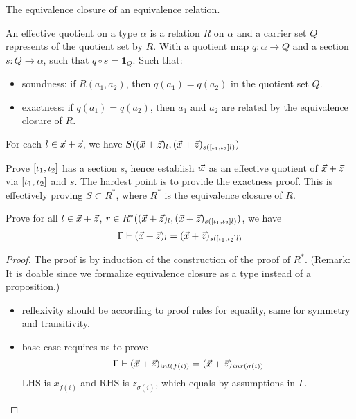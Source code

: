\begin{definition}
  The equivalence closure of an equivalence relation.
  \leanok
\end{definition}

\begin{definition}
  \leanok
  An effective quotient on a type $\alpha$ is a relation $R$ on $\alpha$ and a carrier set $Q$ represents of the quotient
  set by $R$. With a quotient map $q:\alpha\to Q$ and a section $s:Q\to \alpha$, such that $q\circ s = \mathbf{1}_Q$. Such that:
  \begin{itemize}
    \item soundness: if $R(a_1,a_2)$, then $q(a_1) = q(a_2)$ in the quotient set $Q$.
    \item exactness: if $q(a_1) = q(a_2)$, then $a_1$ and $a_2$ are related by the equivalence closure of $R$.
  \end{itemize}

\end{definition}

\begin{lemma}\label{Lem:CovWit1}
  For each $l\in \vec{x}+\vec{z}$, we have $S((\vec{x}+\vec{z})_l, (\vec{x}+\vec{z})_{s([\iota_1,\iota_2] l)})$
\end{lemma}

\begin{lemma}\label{Lem:CovWit2}
  Prove $[\iota_1,\iota_2]$ has a section $s$, hence establish $\vec{w}$ as an effective quotient of $\vec{x} +\vec{z}$ via $[\iota_1,\iota_2]$ and $s$.
  The hardest point is to provide the exactness proof.
  This is effectively proving $S\subset R^*$, where $R^*$ is the equivalence closure of $R$.
\end{lemma}


\begin{lemma}\label{Lem:CovWit3}
  Prove for all $l\in \vec{x}+\vec{z}$, $r\in R^*((\vec{x}+\vec{z})_l,(\vec{x}+\vec{z})_{s([\iota_1,\iota_2] l)})$, we have
  \begin{equation*}
    \Gamma \vdash (\vec{x}+\vec{z})_l = (\vec{x}+\vec{z})_{s([\iota_1,\iota_2] l)}
  \end{equation*}
\end{lemma}

\begin{proof}
  The proof is by induction of the construction of the proof of $R^*$. (Remark: It is doable since we formalize equivalence closure 
  as a type instead of a proposition.)

\begin{itemize}
    \item reflexivity should be according to proof rules for equality, same for symmetry and transitivity.
    \item base case requires us to prove
    \[\Gamma\vdash (\vec{x}+\vec{z})_{inl(f(i))} = (\vec{x}+\vec{z})_{inr(\sigma(i))}\]
    LHS is $x_{f(i)}$ and RHS is $z_{\sigma(i)}$, which equals by assumptions in $\Gamma$.
\end{itemize}
\end{proof}

